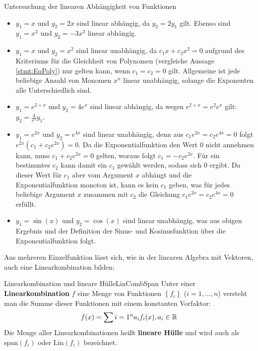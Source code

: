 \begin{example}{Untersuchung der linearen Abhängigkeit von Funktionen}{}
    \begin{itemize}
        \item $y_1=x$ und $y_2=2x$ sind linear abhängig, da $y_2 = 2 y_1$ gilt. Ebenso sind $y_1=x^2$ und $y_2=-3x^2$ linear abhängig.
        \item $y_1=x$ und $y_2=x^2$ sind linear unabhängig, da $c_1 x + c_2 x^2 = 0$ aufgrund des Kriteriums für die Gleichheit von Polynomen (vergleiche Aussage \ref{stmt:EqPoly}) nur gelten kann, wenn $c_1=c_2=0$ gilt. Allgemeine ist jede beliebige Anzahl von Monomen $x^n$ linear unabhängig, solange die Exponenten alle Unterschiedlich sind.
        \item $y_1=e^{2+x}$ und $y_2=4e^x$ sind linear abhängig, da wegen $e^{2+x} = e^2 e^x$ gilt: $y_2 = \frac{4}{e^2} y_1$.
        \item $y_1=e^{2x}$ und $y_2=e^{4x}$ sind linear unabhängig, denn aus $c_1 e^{2x} = c_2 e^{4x}=0$ folgt $e^{2x}\left(c_1 + c_2 e^{2x}\right) = 0$. Da die Exponentialfunktion den Wert $0$ nicht annehmen kann, muss $c_1 + c_2 e^{2x} = 0$ gelten, woraus folgt $c_1 = - c_2 e^{2x}$. Für ein bestimmtes $c_2$ kann damit ein $c_1$ gewählt werden, sodass sich $0$ ergibt. Da dieser Wert für $c_1$ aber vom Argument $x$ abhängt und die Exponentialfunktion monoton ist, kann es kein $c_1$ geben, was für jedes beliebige Argument $x$ zusammen mit $c_2$ die Gleichung $c_1 e^{2x} = c_2 e^{4x}=0$ erfüllt.
        \item $y_1=\sin(x)$ und $y_2 = \cos(x)$ sind linear unabhängig, was aus obigen Ergebnis und der Definition der Sinus- und Kosinusfunktion über die Exponentialfunktion folgt.
    \end{itemize}
\end{example}

Aus mehreren Einzelfunktion lässt sich, wie in der linearen Algebra mit Vektoren, auch eine Linearkombination bilden:

\begin{definition}{Linearkombination und lineare Hülle}{LinCombSpan}
    Unter einer \textbf{Linearkombination} $f$ eine Menge von Funktionen $\left\lbrace f_i \right\rbrace$ ($i=1,\dots,n$) versteht man die Summe dieser Funktionen mit einem konstanten Vorfaktor:
    $$
        f(x) = \sum\limits{i=1}^n a_i f_i(x), a_i \in \mathbb{R}
    $$
    Die Menge aller Linearkombinationen heißt \textbf{lineare Hülle} und wird auch als $\text{span}(f_i)$ oder $\text{Lin}(f_i)$ bezeichnet.
\end{definition}

